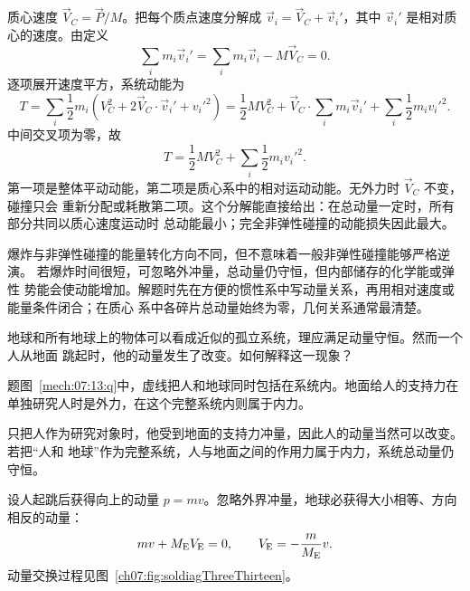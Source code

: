 {质心速度 $\vec V_C=\vec P/M$。把每个质点速度分解成 $\vec v_i=\vec V_C+\vec v_i'$，其中
$\vec v_i'$ 是相对质心的速度。由定义
\[
 \sum_i m_i\vec v_i'=\sum_i m_i\vec v_i-M\vec V_C=0.
\]
逐项展开速度平方，系统动能为
\[
 T=\sum_i\frac12m_i(V_C^2+2\vec V_C\cdot\vec v_i'+{v_i'}^2)
 =\frac12MV_C^2+\vec V_C\cdot\sum_i m_i\vec v_i'+\sum_i\frac12m_i{v_i'}^2.
\]
中间交叉项为零，故
\begin{equation}
 T=\frac12MV_C^2+\sum_i\frac12m_i{v_i'}^2.
\end{equation}
第一项是整体平动动能，第二项是质心系中的相对运动动能。无外力时 $\vec V_C$ 不变，碰撞只会
重新分配或耗散第二项。这个分解能直接给出：在总动量一定时，所有部分共同以质心速度运动时
总动能最小；完全非弹性碰撞的动能损失因此最大。

爆炸与非弹性碰撞的能量转化方向不同，但不意味着一般非弹性碰撞能够严格逆演。
若爆炸时间很短，可忽略外冲量，总动量仍守恒，但内部储存的化学能或弹性
势能会使动能增加。解题时先在方便的惯性系中写动量关系，再用相对速度或能量条件闭合；在质心
系中各碎片总动量始终为零，几何关系通常最清楚。


\begin{origexamplebox}{}\label{ch07:ex:s08-3-13}
地球和所有地球上的物体可以看成近似的孤立系统，理应满足动量守恒。然而一个人从地面
跳起时，他的动量发生了改变。如何解释这一现象？

\begin{qualityfigure}
\label{mech:07:13:q}
\end{qualityfigure}
\end{origexamplebox}

\begin{xesolution}题图~\ref{mech:07:13:q}中，虚线把人和地球同时包括在系统内。地面给人的支持力在单独研究人时是外力，在这个完整系统内则属于内力。

只把人作为研究对象时，他受到地面的支持力冲量，因此人的动量当然可以改变。若把“人和
地球”作为完整系统，人与地面之间的作用力属于内力，系统总动量仍守恒。

设人起跳后获得向上的动量 $p=mv$。忽略外界冲量，地球必获得大小相等、方向相反的动量：
\[
 mv+M_{\rm E}V_{\rm E}=0,
 \qquad
 V_{\rm E}=-\frac{m}{M_{\rm E}}v.
\]
动量交换过程见图~\ref{ch07:fig:soldiagThreeThirteen}。


\end{xesolution}}
